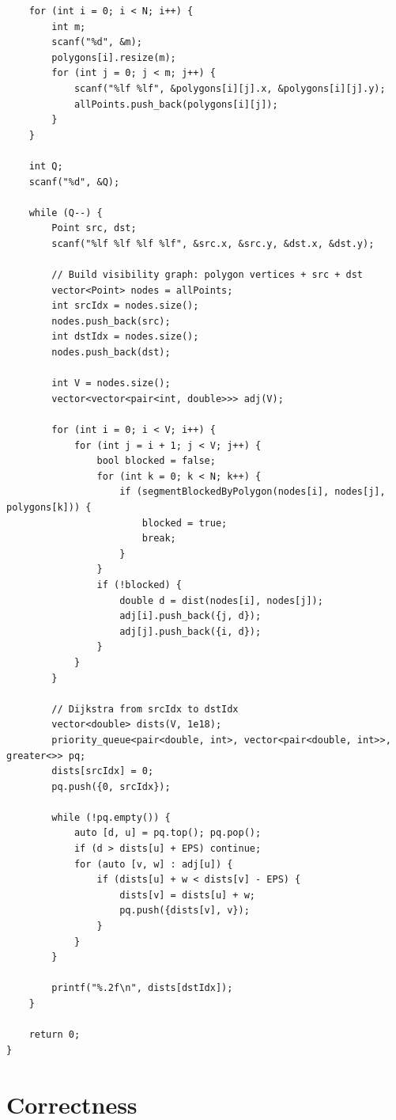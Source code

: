 \documentclass[11pt,a4paper]{article}
\begin{document}
\begin{lstlisting}
    for (int i = 0; i < N; i++) {
        int m;
        scanf("%d", &m);
        polygons[i].resize(m);
        for (int j = 0; j < m; j++) {
            scanf("%lf %lf", &polygons[i][j].x, &polygons[i][j].y);
            allPoints.push_back(polygons[i][j]);
        }
    }

    int Q;
    scanf("%d", &Q);

    while (Q--) {
        Point src, dst;
        scanf("%lf %lf %lf %lf", &src.x, &src.y, &dst.x, &dst.y);

        // Build visibility graph: polygon vertices + src + dst
        vector<Point> nodes = allPoints;
        int srcIdx = nodes.size();
        nodes.push_back(src);
        int dstIdx = nodes.size();
        nodes.push_back(dst);

        int V = nodes.size();
        vector<vector<pair<int, double>>> adj(V);

        for (int i = 0; i < V; i++) {
            for (int j = i + 1; j < V; j++) {
                bool blocked = false;
                for (int k = 0; k < N; k++) {
                    if (segmentBlockedByPolygon(nodes[i], nodes[j], polygons[k])) {
                        blocked = true;
                        break;
                    }
                }
                if (!blocked) {
                    double d = dist(nodes[i], nodes[j]);
                    adj[i].push_back({j, d});
                    adj[j].push_back({i, d});
                }
            }
        }

        // Dijkstra from srcIdx to dstIdx
        vector<double> dists(V, 1e18);
        priority_queue<pair<double, int>, vector<pair<double, int>>, greater<>> pq;
        dists[srcIdx] = 0;
        pq.push({0, srcIdx});

        while (!pq.empty()) {
            auto [d, u] = pq.top(); pq.pop();
            if (d > dists[u] + EPS) continue;
            for (auto [v, w] : adj[u]) {
                if (dists[u] + w < dists[v] - EPS) {
                    dists[v] = dists[u] + w;
                    pq.push({dists[v], v});
                }
            }
        }

        printf("%.2f\n", dists[dstIdx]);
    }

    return 0;
}
\end{lstlisting}

\section{Correctness}
\end{document}
